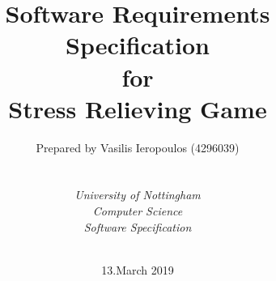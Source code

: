 

\def\Institute{\textit{University of Nottingham}}
\def\Course{\textit{Computer Science}}
\def\Module{\textit{ Software Specification}}



\def\BoldTitle{Software Requirements Specification}

\def\Subtitle{for \\ Stress Relieving Game \\}
\def\Authors{Prepared by Vasilis Ieropoulos (4296039) } 
\def\Shortname{V.Ieropoulos}

\title{\textbf{\BoldTitle}\\\Subtitle}
\author{\Authors \\ \\ \\ \Institute\\ \Course\\ \Module\\ \Docent\\ \Assistant}
\date{13.March 2019}

